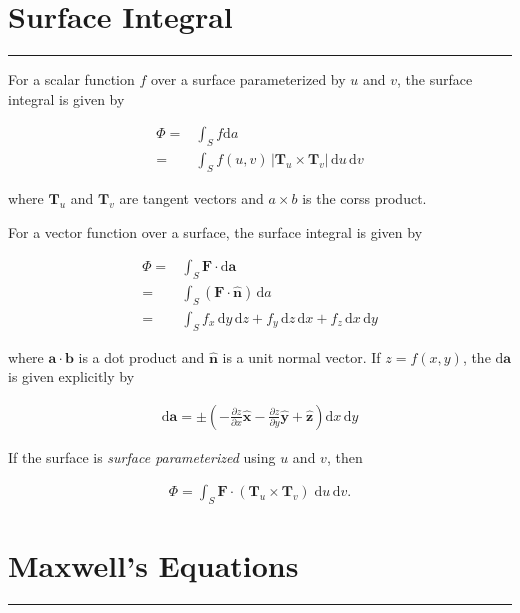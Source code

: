 \documentclass[letterpaper,10pt,titlepage]{article}
\numberwithin{equation}{section}
\begin{document}
\section*{Surface Integral}
\hrule
\addtocounter{section}{1}

For a scalar function $f$ over a surface parameterized by $u$ and $v$, the surface integral is given by

\begin{align}
  \Phi =& \int_S f \mathrm{d}a\,\\
       =& \int_S f(u,v)\, |\mathbf{T}_u \times \mathbf{T}_v|\,
          \mathrm{d}u\, \mathrm{d}v
\end{align}

where $\mathbf{T}_u$ and $\mathbf{T}_v$ are tangent vectors and $a \times b$
is the corss product.

For a vector function over a surface, the surface integral is given by

\begin{align}
  \Phi =& \int_S \mathbf{F} \cdot \mathrm{d}\mathbf{a}\,\\
       =& \int_S (\mathbf{F \cdot \hat{n}})\, \mathrm{d}a\,\\
       =& \int_S f_x\, \mathrm{d}y\, \mathrm{d}z + f_y\, \mathrm{d}z\,
          \mathrm{d}x + f_z\, \mathrm{d}x\, \mathrm{d}y
\end{align}

where $\mathbf{a \cdot b}$ is a dot product and $\mathbf{\hat{n}}$ is a unit normal
vector. If $z = f (x, y)$, the $\mathrm{d}\mathbf{a}$ is given explicitly by

\begin{align}
  \mathrm{d}\mathbf{a} = \pm \left( -
                                \frac{\partial z}{\partial x} \mathbf{\hat{x}} -
                                \frac{\partial z}{\partial y} \mathbf{\hat{y}} +
                                \mathbf{\hat{z}}
                             \right)
                         \mathrm{d}x\, \mathrm{d}y
\end{align}

If the surface is \emph{surface parameterized} using $u$ and $v$, then

\begin{align}
  \Phi = \int_S \mathbf{F} \cdot (\mathbf{T}_u \times \mathbf{T}_v)\;
         \mathrm{d}u\, \mathrm{d}v.
\end{align}

\newpage

\section*{Maxwell's Equations}
\hrule
\setcounter{section}{2}
\setcounter{equation}{0}
\end{document}
